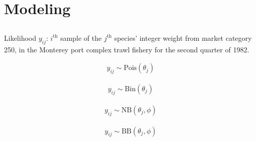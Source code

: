 \documentclass[ xcolor = pdftex, dvipsnames, table ]{beamer}
\begin{document}
%
%

%
\section{Modeling}
\subsection{}
\begin{frame}{Likelihood}
$y_{ij}$: $i^{\text{th}}$ sample of the $j^{\text{th}}$ species' integer 
weight from market category 250, in the Monterey port complex trawl
fishery for the second quarter of 1982.

\begin{minipage}{0.24\textwidth}
\begin{eqnarray*}
y_{ij} \sim \text{Pois}(\theta_j)
\end{eqnarray*}
\end{minipage}
\begin{minipage}{0.24\textwidth}
\begin{eqnarray*}
y_{ij} \sim \text{Bin}(\theta_j)
\end{eqnarray*}
\end{minipage}
\begin{minipage}{0.24\textwidth}
\begin{eqnarray*}
y_{ij} \sim \text{NB}(\theta_j, \phi)
\end{eqnarray*}
\end{minipage}
\begin{minipage}{0.24\textwidth}
\begin{eqnarray*}
y_{ij} \sim \text{BB}(\theta_j, \phi)
\end{eqnarray*}
\end{minipage}
\end{frame}
\end{document}
